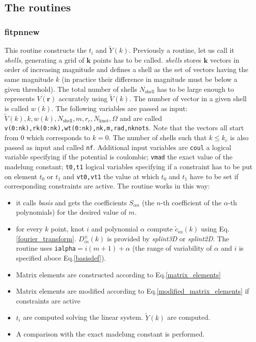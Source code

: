 \documentclass{revtex4}
\newcommand{\rv}{\mathbf{r}}
\newcommand{\kv}{\mathbf{k}}
\newcommand{\tV}{\widetilde{V}}
\newcommand{\tc}{\widetilde{c}}
\newcommand{\tY}{\widetilde{Y}}
\begin{document}
\subsection*{The routines}
\subsubsection*{fitpnnew}
This routine constructs the $t_i$ and $\tY(k)$. Previously a routine, 
let us call it {\em shells}, generating a grid of $\kv$ points has to
be called. {\em shells} stores $\kv$ vectors
in order of increasing magnitude and defines a shell as the 
set of vectors having the same magnitude $k$ (in practice their difference 
in magnitude must be below a given threshold). The total number of
shells $N_\text{shell}$ has to be large enough to represents $V(\rv)$
accurately using $\tV(k)$. The number of vector
in a given shell is called $w(k)$. The following variables are passed as
input: $\tV(k),k,w(k),N_\text{shell},m,r_c,N_\text{knot},\Omega$ and are called
\verb!v(0:nk),rk(0:nk),wt(0:nk),nk,m,rad,nknots!. Note that the vectors all
start from $0$ which corresponds to $k=0$. The number of shells such that
$k\le k_c$ is also passed as input and called \verb!nf!. Additional input variables 
are  \verb!coul! a logical variable specifying if the potential is coulombic; 
\verb!vmad! the exact value of the madelung constant;
\verb!t0,t1! logical variables specifying if a constraint has to be put
on element $t_0$ or $t_1$ and \verb!vt0,vt1! the value at which $t_0$ and $t_1$
have to be set if corresponding constraints are active. 
The routine works in this way:
\begin{itemize}
\item it calls {\em basis} and gets the coefficients $S_{\alpha n}$ (the $n$-th
      coefficient of the $\alpha$-th polynomials) for the desired value of $m$.
\item for every $k$ point, knot $i$ and polynomial $\alpha$ compute $\tc_{i\alpha}(k)$
      using Eq.\ref{fourier_transform}. $D^\pm_{in}(k)$ is provided by {\em splint3D}
      or {\em splint2D}. The routine uses \verb!ialpha!$=i(m+1)+\alpha$ (the range of 
      variability of $\alpha$ and $i$ is specified aboce Eq.\ref{basisdef}).
\item Matrix elements are constructed according to Eq.\ref{matrix_elements}
\item Matrix elements are modified according to Eq.\ref{modified_matrix_elements} 
      if constraints are active
\item $t_i$ are computed solving the linear system. $\tY(k)$ are computed.
\item A comparison with the exact madelung constant is performed.
\end{itemize}
\end{document}
